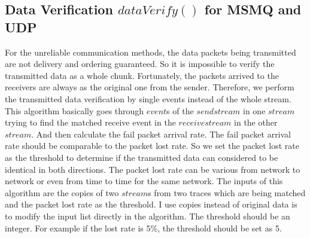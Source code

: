 \subsection{Data Verification $dataVerify()$ for MSMQ and UDP}
For the unreliable communication methods, the data packets being transmitted are not delivery and ordering guaranteed. So it is impossible to verify the transmitted data as a whole chunk. Fortunately, the packets arrived to the receivers are always as the original one from the sender. Therefore, we perform the transmitted data verification by single events instead of the whole stream. This algorithm basically goes through $event$s of the $sendstream$ in one $stream$ trying to find the matched receive event in the $receivestream$ in the other $stream$. And then calculate the fail packet arrival rate. The fail packet arrival rate should be comparable to the packet lost rate. So we set the packet lost rate as the threshold to determine if the transmitted data can considered to be identical in both directions. The packet lost rate can be various from network to network or even from time to time for the same network. The inputs of this algorithm are the copies of two $stream$s from two traces which are being matched and the packet lost rate as the threshold. I use copies instead of original data is to modify the input list directly in the algorithm. The threshold should be an integer. For example if the lost rate is 5\%, the threshold should be set as 5. 
